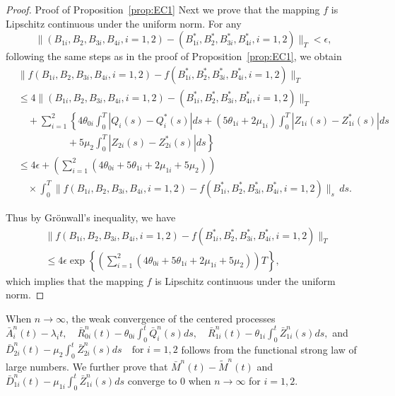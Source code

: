 \begin{proof}{Proof of Proposition~\ref{prop:EC1}}
Next we prove that the mapping $f$ is Lipschitz continuous under the uniform norm.
For any
\begin{equation*}
  \|(B_{1i}, B_2, B_{3i}, B_{4i}, i=1,2) - (B^*_{1i}, B^*_2, B^*_{3i}, B^*_{4i}, i=1,2)\|_T < \epsilon,
\end{equation*}
following the same steps as in the proof of Proposition~\ref{prop:EC1}, we obtain
\begin{align}
&\|f(B_{1i}, B_2, B_{3i}, B_{4i}, i=1,2) - f(B^*_{1i}, B^*_2, B^*_{3i}, B^*_{4i}, i=1,2)\|_T \nonumber \\
&\leq 4\|(B_{1i}, B_2, B_{3i}, B_{4i}, i=1,2) - (B^*_{1i}, B^*_2, B^*_{3i}, B^*_{4i}, i=1,2)\|_T \nonumber \\
&\quad + \sum_{i=1}^{2}\left\{4\theta_{0i} \int_0^T |Q_i(s) - Q_i^*(s)|ds + (5\theta_{1i} + 2\mu_{1i}) \int_0^T |Z_{1i}(s) - Z^*_{1i}(s)|ds \right. \nonumber \\
&\quad\quad\quad\quad\quad + \left. 5\mu_2 \int_0^T |Z_{2i}(s) - Z^*_{2i}(s)|ds\right\} \nonumber \\
&\leq 4\epsilon + \left(\sum_{i=1}^{2}(4\theta_{0i} + 5\theta_{1i} + 2\mu_{1i} + 5\mu_2)\right) \nonumber \\
&\quad \times \int_0^T \|f(B_{1i}, B_2, B_{3i}, B_{4i}, i=1,2) - f(B^*_{1i}, B^*_2, B^*_{3i}, B^*_{4i}, i=1,2)\|_s \, ds.
\end{align}

Thus by Grönwall's inequality, we have
\begin{align}
&\|f(B_{1i}, B_2, B_{3i}, B_{4i}, i=1,2) - f(B^*_{1i}, B^*_2, B^*_{3i}, B^*_{4i}, i=1,2)\|_T \nonumber \\
&\leq 4\epsilon \exp\left\{\left(\sum_{i=1}^{2}(4\theta_{0i} + 5\theta_{1i} + 2\mu_{1i} + 5\mu_2)\right)T\right\},
\end{align}
which implies that the mapping $f$ is Lipschitz continuous under the uniform norm. 
\Halmos
\end{proof}

When $n \to \infty$, the weak convergence of the centered processes
\(
\bar{A}_i^n(t) - \lambda_i t, \quad \bar{R}^n_{0i}(t) - \theta_{0i} \int_0^t \bar{Q}_i^n(s)ds, \quad \bar{R}^n_{1i}(t) - \theta_{1i} \int_0^t \bar{Z}^n_{1i}(s)ds,
\)
and
\(
\bar{D}^n_{2i}(t) - \mu_2 \int_0^t \bar{Z}^n_{2i}(s)ds \quad \text{for } i = 1,2
\)
follows from the functional strong law of large numbers. We further prove that $\bar{M}^n(t) - \tilde{M}^n(t)$ and $\bar{D}^n_{1i}(t) - \mu_{1i} \int_0^t \bar{Z}^n_{1i}(s)ds$ converge to 0 when $n \to \infty$ for $i = 1,2$.

